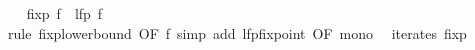 \begin{isabellebody}
\ \ \isamarkupfalse%
\ {\isachardoublequoteopen}fixp\ f\ {\isasymle}\ lfp\ f{\isachardoublequoteclose}\isanewline
\ \ \ \ \isamarkupfalse%
\ {\isacharparenleft}{\kern0pt}rule\ fixp{\isacharunderscore}{\kern0pt}lowerbound\ {\isacharbrackleft}{\kern0pt}OF\ f{\isacharprime}{\kern0pt}{\isacharbrackright}{\kern0pt}{\isacharparenright}{\kern0pt}\ {\isacharparenleft}{\kern0pt}simp\ add{\isacharcolon}{\kern0pt}\ lfp{\isacharunderscore}{\kern0pt}fixpoint\ {\isacharbrackleft}{\kern0pt}OF\ mono{\isacharbrackright}{\kern0pt}{\isacharparenright}{\kern0pt}\isanewline
{}\isamarkupfalse%
%
\endisatagproof
{\isafoldproof}%
%
\isadelimproof
\isanewline
%
\endisadelimproof
\isanewline
{}\isamarkupfalse%
\ {\isacharparenleft}{\kern0pt}\ iterates\ fixp\isanewline
%
\isadelimtheory
\isanewline
%
\endisadelimtheory
%
\isatagtheory
{}\isamarkupfalse%
%
\endisatagtheory
{\isafoldtheory}%
%
\isadelimtheory
%
\endisadelimtheory
%
\end{isabellebody}%
\endinput

